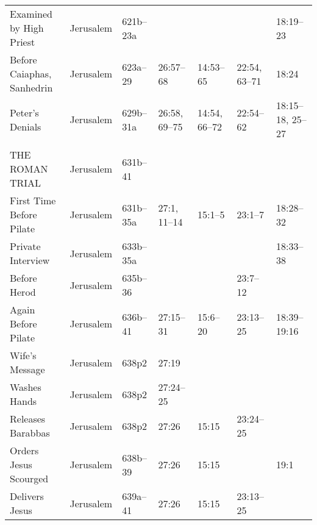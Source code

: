 \begin{longtable}[h]{l@{\hspace{0.5em}}l@{\hspace{0.5em}}l@{\hspace{0.5em}}BBBB}
\qquad Examined by High Priest             & Jerusalem           & 621b--23a          &                   &                    &                       & 18:19--23 \\
\quad Before Caiaphas, Sanhedrin           & Jerusalem           & 623a--29           & 26:57--68         & 14:53--65          & 22:54, 63--71         & 18:24 \\
\quad Peter's Denials                      & Jerusalem           & 629b--31a          & 26:58, 69--75     & 14:54, 66--72      & 22:54--62             & 18:15--18, 25--27 \\
\\
THE ROMAN TRIAL                            & Jerusalem           & 631b--41           &                   &                    &                       & \\
\quad First Time Before Pilate             & Jerusalem           & 631b--35a          & 27:1, 11--14      & 15:1--5            & 23:1--7               & 18:28--32 \\
\qquad Private Interview                   & Jerusalem           & 633b--35a          &                   &                    &                       & 18:33--38 \\
\quad Before Herod                         & Jerusalem           & 635b--36           &                   &                    & 23:7--12              & \\
\quad Again Before Pilate                  & Jerusalem           & 636b--41           & 27:15--31         & 15:6--20           & 23:13--25             & 18:39--19:16 \\
\qquad Wife's Message                      & Jerusalem           & 638p2              & 27:19             &                    &                       & \\
\qquad Washes Hands                        & Jerusalem           & 638p2              & 27:24--25         &                    &                       & \\
\qquad Releases Barabbas                   & Jerusalem           & 638p2              & 27:26             & 15:15              & 23:24--25             & \\
\qquad Orders Jesus Scourged               & Jerusalem           & 638b--39           & 27:26             & 15:15              &                       & 19:1 \\
\qquad Delivers Jesus                      & Jerusalem           & 639a--41           & 27:26             & 15:15              & 23:13--25             & \\

\end{longtable}
